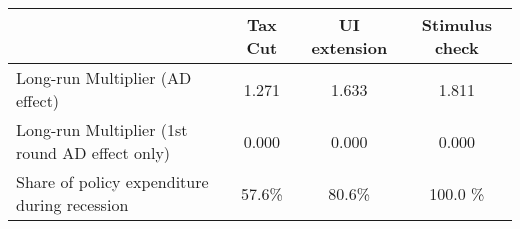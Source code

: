 \begin{tabular}{@{}lccc@{}} 
\toprule 
& Tax Cut    & UI extension    & Stimulus check    \\  \midrule 
Long-run Multiplier (AD effect) &1.271  & 1.633  & 1.811     \\ 
Long-run Multiplier (1st round AD effect only) &0.000  & 0.000  & 0.000     \\ 
Share of policy expenditure during recession &57.6\%  & 80.6\%  & 100.0 \%    \\ 
\end{tabular}  

